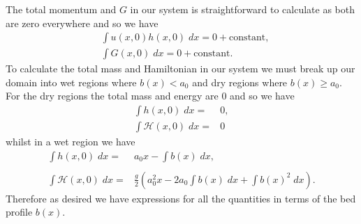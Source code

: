 The total momentum and $G$ in our system is straightforward to calculate as both are zero everywhere and so we have 
\begin{align}
&\int u(x,0)h(x,0) \;  dx = {} 0 + \text{constant}, \\
&\int G(x,0) \; dx = {} 0 + \text{constant}.
\end{align}
To calculate the total mass and Hamiltonian in our system we must break up our domain into wet regions where $b(x) < a_0$ and dry regions where $b(x) \ge a_0$. For the dry regions the total mass and energy are $0$ and so we have 
\begin{subequations}
	\begin{align}
	\int h(x,0) \; dx = {} & 0 , \\
	\int \mathcal{H}(x,0) \; dx = {} & 0
	\end{align}
\end{subequations}
whilst in a wet region we have 
\begin{subequations}
	\begin{align}
	\int h(x,0) \; dx = {} & a_0 x -  \int b(x) \; dx , \\  \nonumber \\
	\int \mathcal{H}(x,0) \; dx = {} & \frac{g}{2} \left(a_0^2x  -  2a_0 \int b(x) \; dx + \int b(x)^2 \; dx \right).
	\end{align}
\end{subequations}
Therefore as desired we have expressions for all the quantities in terms of the bed profile $b(x)$. 
